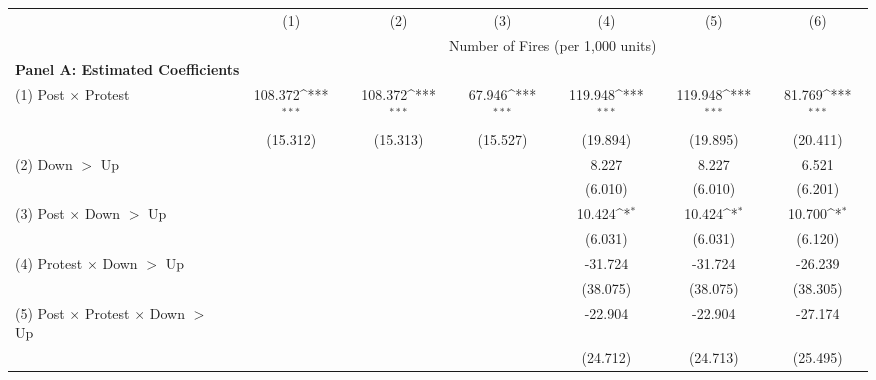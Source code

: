 {
\def\sym#1{\ifmmode^{#1}\else\(^{#1}\)\fi}
\begin{tabular}{l*{6}{c}}
\hline
            &\multicolumn{1}{c}{(1)}         &\multicolumn{1}{c}{(2)}         &\multicolumn{1}{c}{(3)}         &\multicolumn{1}{c}{(4)}         &\multicolumn{1}{c}{(5)}         &\multicolumn{1}{c}{(6)}         \\
            & \multicolumn{6}{c}{Number of Fires (per 1,000 units)} \\ \hline
\multicolumn{7}{l}{\textbf{Panel A: Estimated Coefficients}} \\ \hline
(1) Post $\times$ Protest&     108.372\sym{***}&     108.372\sym{***}&      67.946\sym{***}&     119.948\sym{***}&     119.948\sym{***}&      81.769\sym{***}\\
            &    (15.312)         &    (15.313)         &    (15.527)         &    (19.894)         &    (19.895)         &    (20.411)         \\
(2) Down $>$ Up&                     &                     &                     &       8.227         &       8.227         &       6.521         \\
            &                     &                     &                     &     (6.010)         &     (6.010)         &     (6.201)         \\
(3) Post $\times$ Down $>$ Up&                     &                     &                     &      10.424\sym{*}  &      10.424\sym{*}  &      10.700\sym{*}  \\
            &                     &                     &                     &     (6.031)         &     (6.031)         &     (6.120)         \\
(4) Protest $\times$ Down $>$ Up&                     &                     &                     &     -31.724         &     -31.724         &     -26.239         \\
            &                     &                     &                     &    (38.075)         &    (38.075)         &    (38.305)         \\
(5) Post $\times$ Protest $\times$ Down $>$ Up&                     &                     &                     &     -22.904         &     -22.904         &     -27.174         \\
            &                     &                     &                     &    (24.712)         &    (24.713)         &    (25.495)         \\





\end{tabular}}
